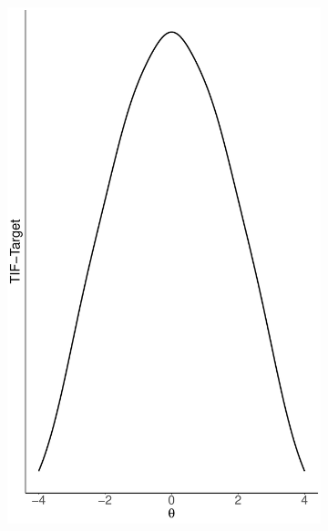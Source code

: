 \documentclass[12pt, a4paper, titilepage]{article}
\begin{document}
\begin{figure}
	\centering
	\begin{subfigure}{0.45\linewidth}
		\includegraphics[width=\textwidth]{img/target_n}
		\caption{}
		\label{fig:targetN}
	\end{subfigure}
	\begin{subfigure}{0.45\linewidth}

\end{subfigure}
\end{figure}
\end{document}
